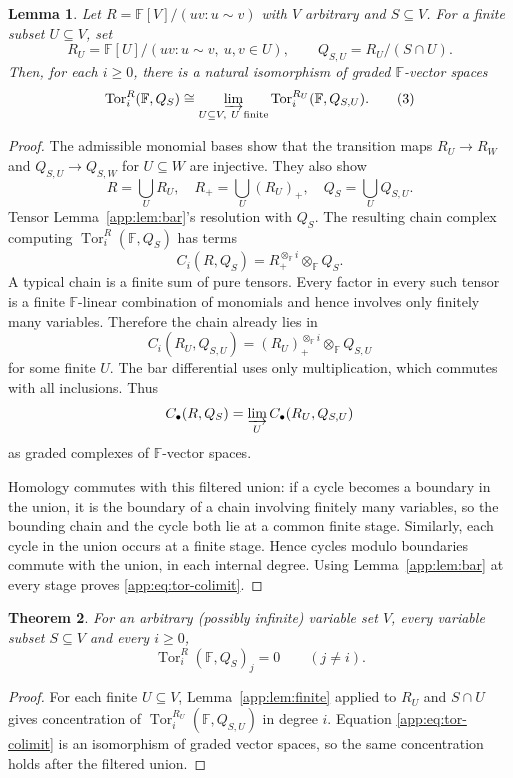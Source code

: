 \documentclass[11pt]{article}
\numberwithin{equation}{section}
\newtheorem{theorem}{Theorem}[section]
\newtheorem{lemma}[theorem]{Lemma}
\theoremstyle{definition}
\theoremstyle{remark}
\newcommand{\Tor}{\operatorname{Tor}}
\begin{document}
\begin{lemma}\label{app:lem:colimit}
Let $R=\mathbb F[V]/(uv:u\sim v)$ with $V$ arbitrary and $S\subseteq V$.  For a finite subset $U\subseteq V$, set
\[
R_U=\mathbb F[U]/(uv:u\sim v,\ u,v\in U),
\qquad Q_{S,U}=R_U/(S\cap U).
\]
Then, for each $i\ge0$, there is a natural isomorphism of graded $\mathbb F$-vector spaces
\[
\Tor_i^R(\mathbb F,Q_S)
\cong\varinjlim_{U\subseteq V,\ U\text{ finite}}
\Tor_i^{R_U}(\mathbb F,Q_{S,U}).
\tag{3}\label{app:eq:tor-colimit}
\]
\end{lemma}
\begin{proof}
The admissible monomial bases show that the transition maps $R_U\to R_W$ and $Q_{S,U}\to Q_{S,W}$ for $U\subseteq W$ are injective.  They also show
\[
R=\bigcup_U R_U,
\quad R_+=\bigcup_U(R_U)_+,
\quad Q_S=\bigcup_U Q_{S,U}.
\]
Tensor Lemma~\ref{app:lem:bar}'s resolution with $Q_S$.  The resulting chain complex computing $\Tor_i^R(\mathbb F,Q_S)$ has terms
\[
C_i(R,Q_S)=R_+^{\otimes_\mathbb F i}\otimes_\mathbb F Q_S.
\]
A typical chain is a finite sum of pure tensors.  Every factor in every such tensor is a finite $\mathbb F$-linear combination of monomials and hence involves only finitely many variables.  Therefore the chain already lies in
\[
C_i(R_U,Q_{S,U})=(R_U)_+^{\otimes_\mathbb F i}\otimes_\mathbb F Q_{S,U}
\]
for some finite $U$.  The bar differential uses only multiplication, which commutes with all inclusions.  Thus
\[
C_\bullet(R,Q_S)=\varinjlim_U C_\bullet(R_U,Q_{S,U})
\]
as graded complexes of $\mathbb F$-vector spaces.

Homology commutes with this filtered union: if a cycle becomes a boundary in the union, it is the boundary of a chain involving finitely many variables, so the bounding chain and the cycle both lie at a common finite stage.  Similarly, each cycle in the union occurs at a finite stage.  Hence cycles modulo boundaries commute with the union, in each internal degree.  Using Lemma~\ref{app:lem:bar} at every stage proves \eqref{app:eq:tor-colimit}.
\end{proof}

\begin{theorem}\label{app:thm:linearity}
For an arbitrary (possibly infinite) variable set $V$, every variable subset $S\subseteq V$ and every $i\ge0$,
\[
\Tor_i^R(\mathbb F,Q_S)_j=0\qquad(j\ne i).
\tag{4}\label{app:eq:linearity}
\]
\end{theorem}
\begin{proof}
For each finite $U\subseteq V$, Lemma~\ref{app:lem:finite} applied to $R_U$ and $S\cap U$ gives concentration of $\Tor_i^{R_U}(\mathbb F,Q_{S,U})$ in degree $i$.  Equation \eqref{app:eq:tor-colimit} is an isomorphism of graded vector spaces, so the same concentration holds after the filtered union.
\end{proof}
\end{document}
